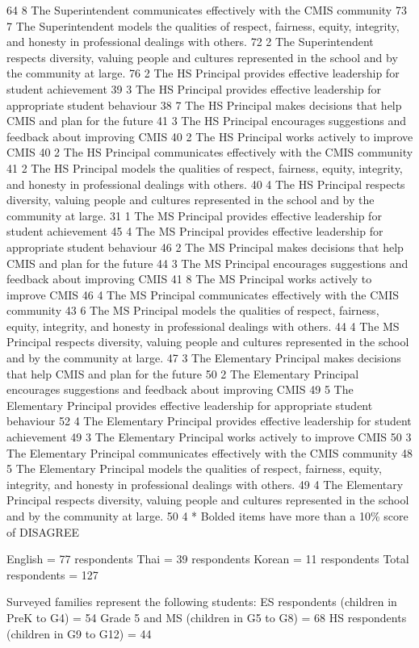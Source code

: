 {64
8
The Superintendent communicates effectively with the CMIS community
73
7
The Superintendent models the qualities of respect, fairness, equity, integrity, and honesty in professional dealings with others.
72
2
The Superintendent respects diversity, valuing people and cultures represented in the school and by the community at large.
76
2
The HS Principal provides effective leadership for student achievement
39
3
The HS Principal provides effective leadership for appropriate student behaviour
38
7
The HS Principal makes decisions that help CMIS and plan for the future
41
3
The HS Principal encourages suggestions and feedback about improving CMIS
40
2
The HS Principal works actively to improve CMIS
40
2
The HS Principal communicates effectively with the CMIS community
41
2
The HS Principal models the qualities of respect, fairness, equity, integrity, and honesty in professional dealings with others.
40
4
The HS Principal respects diversity, valuing people and cultures represented in the school and by the community at large.
31
1
The MS Principal provides effective leadership for student achievement
45
4
The MS Principal provides effective leadership for appropriate student behaviour
46
2
The MS Principal makes decisions that help CMIS and plan for the future
44
3
The MS Principal encourages suggestions and feedback about improving CMIS
41
8
The MS Principal works actively to improve CMIS
46
4
The MS Principal communicates effectively with the CMIS community
43
6
The MS Principal models the qualities of respect, fairness, equity, integrity, and honesty in professional dealings with others.
44
4
The MS Principal respects diversity, valuing people and cultures represented in the school and by the community at large.
47
3
The Elementary Principal makes decisions that help CMIS and plan for the future
50
2
The Elementary Principal encourages suggestions and feedback about improving CMIS
49
5
The Elementary Principal provides effective leadership for appropriate student behaviour
52
4
The Elementary Principal provides effective leadership for student achievement
49
3
The Elementary Principal works actively to improve CMIS
50
3
The Elementary Principal communicates effectively with the CMIS community
48
5
The Elementary Principal models the qualities of respect, fairness, equity, integrity, and honesty in professional dealings with others.
49
4
The Elementary Principal respects diversity, valuing people and cultures represented in the school and by the community at large.
50
4
* Bolded items have more than a 10\% score of DISAGREE

English = 77 respondents
Thai = 39 respondents
Korean = 11 respondents
Total respondents = 127

Surveyed families represent the following students: 
ES respondents (children in PreK to G4) = 54
Grade 5 and MS (children in G5 to G8) = 68
HS respondents (children in G9 to G12) = 44

}

